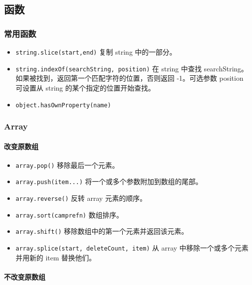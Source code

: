 \subsection{函数}\label{ux51fdux6570}

\subsubsection{常用函数}\label{ux5e38ux7528ux51fdux6570}

\begin{itemize}
\tightlist
\item
  \lstinline!string.slice(start,end)! 复制 string 中的一部分。
\item
  \lstinline!string.indexOf(searchString, position)! 在 string 中查找
  searchString。如果被找到，返回第一个匹配字符的位置，否则返回
  -1。可选参数 position 可设置从 string 的某个指定的位置开始查找。
\item
  \lstinline!object.hasOwnProperty(name)!
\end{itemize}

\subsubsection{Array}\label{array}

\paragraph{改变原数组}\label{ux6539ux53d8ux539fux6570ux7ec4}

\begin{itemize}
\tightlist
\item
  \lstinline!array.pop()! 移除最后一个元素。
\item
  \lstinline!array.push(item...)! 将一个或多个参数附加到数组的尾部。
\item
  \lstinline!array.reverse()! 反转 array 元素的顺序。
\item
  \lstinline!array.sort(camprefn)! 数组排序。
\item
  \lstinline!array.shift()! 移除数组中的第一个元素并返回该元素。
\item
  \lstinline!array.splice(start, deleteCount, item)! 从 array
  中移除一个或多个元素并用新的 item 替换他们。
\end{itemize}

\paragraph{不改变原数组}\label{ux4e0dux6539ux53d8ux539fux6570ux7ec4}


